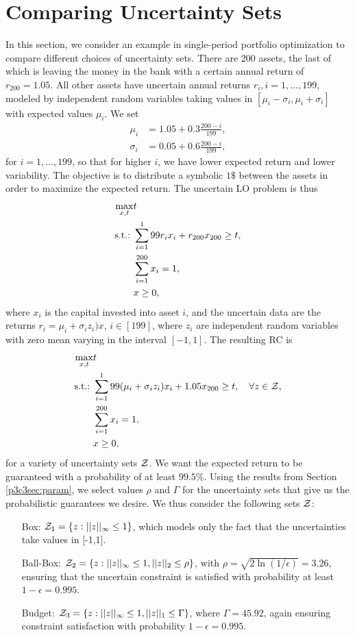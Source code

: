 \section{Comparing Uncertainty Sets}

In this section, we consider an example in single-period portfolio optimization to compare different choices of uncertainty sets. There are 200 assets, the last of which is leaving the money in the bank with a certain annual return of $r_{200} =1.05$. All other assets have uncertain annual returns $r_i, i=1,\dots,199$, modeled by independent random variables taking values in $[\mu_i-\sigma_i, \mu_i+\sigma_i]$ with expected values $\mu_i$. We set
\begin{align*}
\mu_i &= 1.05 + 0.3\frac{200-i}{199}, \\
\sigma_i &= 0.05 + 0.6\frac{200-i}{199},
\end{align*}
for $i=1,\dots,199$, so that for higher $i$, we have lower expected return and lower variability. The objective is to distribute a symbolic $1\$$ between the assets in order to maximize the expected return. The uncertain LO problem is thus
\begin{align*}
\max\limits_{x,t} & t \\
\mathop{\text{s.t.:~}}& \sum\limits_{i=1}^199 r_ix_i + r_{200}x_{200}\geq t,\\
& \sum\limits_{i=1}^{200} x_i = 1, \\
& x\geq 0,
\end{align*}
where $x_i$ is the capital invested into asset $i$, and the uncertain data  are the returns $r_i = \mu_i + \sigma_iz_i)x$, $i\in[199]$, where $z_i$ are independent random variables with zero mean varying in the interval $[-1,1]$. The resulting RC is
\begin{align*}
\max\limits_{x,t} & t \\
\mathop{\text{s.t.:~}} & \sum\limits_{i=1}^199 (\mu_i+\sigma_iz_i)x_i +1.05x_{200}\geq t,\quad \forall z\in\mathcal{Z},\\
& \sum\limits_{i=1}^{200} x_i = 1, \\
& x\geq 0,
\end{align*}
for a variety of uncertainty sets $\mathcal{Z}$. We want the expected return to be guaranteed with a probability of at least $99.5\%$. Using the results from Section \ref{p3c3sec:param}, we select  values $\rho$ and $\Gamma$ for the uncertainty sets that give us the probabilistic guarantees we desire. We thus consider the following sets $\mathcal{Z}$:
\begin{itemize}
	\item[Box:] $\mathcal{Z}_1 = \{z:\vert\vert z \vert\vert_\infty \leq 1\}$, which models only the fact that the uncertainties take values in [-1,1].
	\item[Ball-Box:] $\mathcal{Z}_2 = \{z:\vert\vert z \vert\vert_\infty \leq 1, \vert\vert z \vert\vert_2\leq \rho\}$, with $\rho = \sqrt{2 \ln (1/\epsilon)}=3.26$, ensuring that the uncertain constraint is satisfied with probability at least $1-\epsilon = 0.995$.
	\item[Budget:] $\mathcal{Z}_3 = \{z:\vert\vert z \vert\vert_\infty \leq 1, \vert\vert z \vert\vert_1\leq \Gamma\}$, where $\Gamma = 45.92$, again ensuring constraint satisfaction with probability $1-\epsilon = 0.995$. 
\end{itemize}
